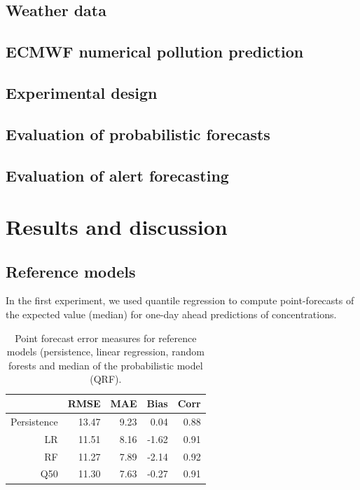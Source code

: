 \documentclass[a4paper,twocolumn,5p]{elsarticle}
\begin{document}
\subsection{Weather data}
\label{sec:weather-data}

\subsection{ECMWF numerical pollution prediction}
\label{sec:ecmwf-numer-poll}


\subsection{Experimental design}
\label{sec:experimental-design}

\subsection{Evaluation of probabilistic forecasts}
\label{sec:eval-prob-forec}


\subsection{Evaluation of alert forecasting}
\label{sec:eval-extr-value}


\section{Results and discussion}
\label{sec:results}


\subsection{Reference models}
\label{sec:deterministic}

In the first experiment, we used quantile regression to compute
point-forecasts of the expected value (median) for one-day ahead
predictions of \no concentrations.

\begin{table}[tbp]
\caption{\label{tab:determ}Point forecast error measures for reference
models (persistence, linear regression, random forests and median of
the probabilistic model (QRF).}
  \centering
\begin{tabular}{rrrrr}
  \toprule
 & RMSE & MAE & Bias & Corr \\ 
  \midrule
  Persistence & 13.47 & 9.23 & 0.04 & 0.88 \\ 
  LR   & 11.51 & 8.16 & -1.62 & 0.91 \\ 
  RF   & 11.27 & 7.89 & -2.14 & 0.92 \\
  Q50  & 11.30 & 7.63 & -0.27 & 0.91 \\ 
   \bottomrule
\end{tabular}
\end{table}
\end{document}
